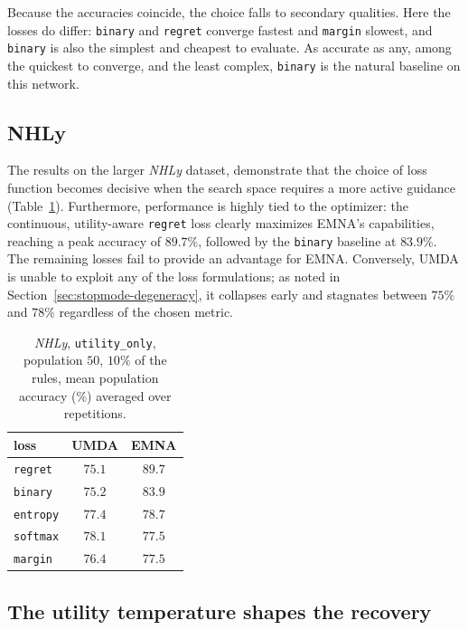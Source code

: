 Because the accuracies coincide, the choice falls to secondary qualities. Here the
losses do differ: \texttt{binary} and \texttt{regret} converge fastest and
\texttt{margin} slowest, and \texttt{binary} is also the simplest and cheapest to
evaluate. As accurate as any, among the quickest to converge, and the least
complex, \texttt{binary} is the natural baseline on this network.

\subsection{NHLy}
\label{sec:fitness-nhlv}

The results on the larger \emph{NHLy} dataset, demonstrate that the choice of loss function becomes decisive when the search space requires a more active guidance (Table~\ref{tab:fitness-nhlv}). Furthermore, performance is highly tied to the optimizer: the continuous, utility-aware \texttt{regret} loss clearly maximizes EMNA's capabilities, reaching a peak accuracy of $89.7\%$, followed by the \texttt{binary} baseline at $83.9\%$. The remaining losses fail to provide an advantage for EMNA. Conversely, UMDA is unable to exploit any of the loss formulations; as noted in Section~\ref{sec:stopmode-degeneracy}, it collapses early and stagnates between $75\%$ and $78\%$ regardless of the chosen metric.

\begin{table}[h!]
\centering
\begin{tabular}{lcc}
\toprule
\textbf{loss} & \textbf{UMDA} & \textbf{EMNA}\\
\midrule
\texttt{regret}  & $75.1$ & $\mathbf{89.7}$\\
\texttt{binary}  & $75.2$ & $83.9$\\
\texttt{entropy} & $77.4$ & $78.7$\\
\texttt{softmax} & $78.1$ & $77.5$\\
\texttt{margin}  & $76.4$ & $77.5$\\
\bottomrule
\end{tabular}
\caption{\emph{NHLy}, \texttt{utility\_only}, population $50$, $10\%$ of the rules,
mean population accuracy (\%) averaged over repetitions.}
\label{tab:fitness-nhlv}
\end{table}


\subsection{The utility temperature shapes the recovery}
\label{sec:fitness-temperature}

